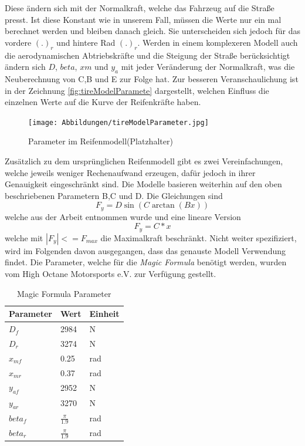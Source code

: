 \documentclass{like}
\begin{document}
Diese ändern sich mit der Normalkraft, welche das Fahrzeug auf die Straße presst. Ist diese Konstant wie in unserem Fall, müssen die Werte nur ein mal berechnet werden und bleiben danach gleich. Sie unterscheiden sich jedoch für das vordere $(.)_r$ und hintere Rad $(.)_r$. Werden in einem komplexeren Modell auch die aerodynamischen Abtriebskräfte und die Steigung der Straße berücksichtigt ändern sich $D$, $beta$, $xm$ und $y_a$ mit jeder Veränderung der Normalkraft, was die Neuberechnung von C,B und E zur Folge hat. Zur besseren Veranschaulichung ist in der Zeichnung \ref{fig:tireModelParamete} dargestellt, welchen Einfluss die einzelnen Werte auf die Kurve der Reifenkräfte haben. 

\begin{figure}[ht!]
	\centering
	\texttt{[image: Abbildungen/tireModelParameter.jpg]}
	\caption{Parameter im Reifenmodell(Platzhalter)}
	\label{fig:tireModelParameter}
\end{figure}
 
Zusätzlich zu dem ursprünglichen Reifenmodell gibt es zwei Vereinfachungen, welche jeweils weniger Rechenaufwand erzeugen, dafür jedoch in ihrer Genauigkeit eingeschränkt sind. Die Modelle basieren weiterhin auf den oben beschriebenen Parametern B,C und D. Die Gleichungen sind 
\begin{equation}
	F_y = D\sin(C\arctan(Bx))
\end{equation} 
welche aus der Arbeit \cite{rc_car_1_43} entnommen wurde und eine lineare Version 
\begin{equation}
	F_y = C * x 
\end{equation} 
welche mit $|F_y| <= F_{max} $ die Maximalkraft beschränkt. Nicht weiter spezifiziert, wird im Folgenden davon ausgegangen, dass das genauste Modell Verwendung findet. Die Parameter, welche für die \textit{Magic Formula} benötigt werden, wurden vom High Octane Motorsports e.V. zur Verfügung gestellt.

\begin{table}[]
	\centering
	\begin{tabular}{l|l|l}
		\hline
		Parameter	&  Wert  & Einheit \\ \hline
		\(D_f\)		&  2984 & N \\
		\(D_r\)		&  3274 & N \\
		\(x_{mf}\)	&  0.25 & rad \\
		\(x_{mr}\)	&  0.37 & rad \\
		\(y_{af}\)	&  2952 & N \\
 		\(y_{ar}\)	&  3270 & N \\
		\(beta_{f}\)	&  $\frac{\pi}{1.9}$ & rad \\
		\(beta_{r}\)	&  $\frac{\pi}{1.9}$ & rad \\
		
	\end{tabular}
	\caption{Magic Formula Parameter}
	\label{tireParam}
\end{table}
\end{document}
